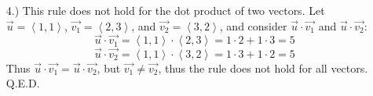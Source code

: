 \documentclass[12pt]{article}
\newcommand{\angleb}[1]{\left\langle#1\right\rangle}
\begin{document}
\pagestyle{fancy}
\fancyhead{}

\normalsize
\begin{itemize}
    \item [4.)] This rule does not hold for the dot product of two vectors. Let $\vec u=\angleb{1,1}$, $\vec{v_1}=\angleb{2,3}$, and $\vec{v_2}=\angleb{3,2}$, and consider $\vec u\cdot\vec{v_1}$ and $\vec u\cdot\vec{v_2}$:
    \[\vec u\cdot\vec{v_1}=\angleb{1,1}\cdot\angleb{2,3}=1\cdot2+1\cdot3=5\]
    \[\vec u\cdot\vec{v_2}=\angleb{1,1}\cdot\angleb{3,2}=1\cdot3+1\cdot2=5\]
    Thus $\vec u\cdot\vec{v_1}=\vec u\cdot\vec{v_2}$, but $\vec{v_1}\ne\vec{v_2}$, thus the rule does not hold for all vectors. Q.E.D.
\end{itemize}
\end{document}
